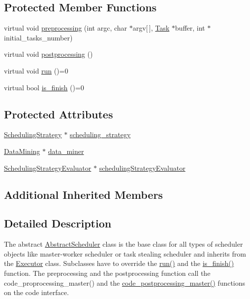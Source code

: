\subsection*{Protected Member Functions}
\begin{DoxyCompactItemize}
\item 
virtual void \hyperlink{class_abstract_scheduler_a284ad11479af671abf7130abb5f69992}{preprocessing} (int argc, char $\ast$argv\mbox{[}$\,$\mbox{]}, \hyperlink{_types_8h_a0c77930ab3818a1680c59353f627fba8}{Task} $\ast$buffer, int $\ast$initial\+\_\+tasks\+\_\+number)
\item 
virtual void \hyperlink{class_abstract_scheduler_a3c2b64a8a6de2687258dea9d58769792}{postprocessing} ()
\item 
virtual void \hyperlink{class_abstract_scheduler_ab5f9142ccfc130e91fa6d92c7d3d7469}{run} ()=0
\item 
virtual bool \hyperlink{class_abstract_scheduler_acc7d6dc38aa80ca77ac892c74b915432}{is\+\_\+finish} ()=0
\end{DoxyCompactItemize}
\subsection*{Protected Attributes}
\begin{DoxyCompactItemize}
\item 
\hyperlink{class_scheduling_strategy}{Scheduling\+Strategy} $\ast$ \hyperlink{class_abstract_scheduler_a7dd11eee79bfb44c820d6c28480fd0c7}{scheduling\+\_\+strategy}
\item 
\hyperlink{class_data_mining}{Data\+Mining} $\ast$ \hyperlink{class_abstract_scheduler_a6e281d90fa4b965779cd13eabf7d0249}{data\+\_\+miner}
\item 
\hyperlink{class_scheduling_strategy_evaluator}{Scheduling\+Strategy\+Evaluator} $\ast$ \hyperlink{class_abstract_scheduler_a5f95e61e03441ca92c6ba8f434be7fe0}{scheduling\+Strategy\+Evaluator}
\end{DoxyCompactItemize}
\subsection*{Additional Inherited Members}


\subsection{Detailed Description}
The abstract \hyperlink{class_abstract_scheduler}{Abstract\+Scheduler} class is the base class for all types of scheduler objects like master-\/worker scheduler or task stealing scheduler and inherits from the \hyperlink{class_executor}{Executor} class. Subclasses have to override the \hyperlink{class_abstract_scheduler_ab5f9142ccfc130e91fa6d92c7d3d7469}{run()} and the \hyperlink{class_abstract_scheduler_acc7d6dc38aa80ca77ac892c74b915432}{is\+\_\+finish()} function. The preprocessing and the postprocessing function call the code\+\_\+proprocessing\+\_\+master() and the \hyperlink{_scientific_code_8cpp_a2dfc976aa95c961d1f76ce3f7c56f243}{code\+\_\+postprocessing\+\_\+master()} functions on the code interface.

